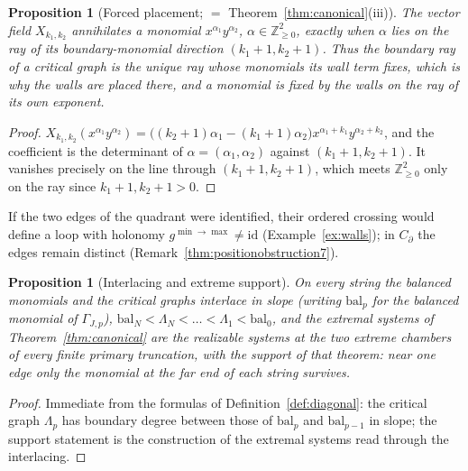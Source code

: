 \documentclass[11pt]{amsart}
\newtheorem{proposition}[theorem]{Proposition}
\theoremstyle{definition}
\theoremstyle{remark}
\newcommand{\ZZ}{\mathbb{Z}}
\begin{document}
\begin{proposition}[Forced placement; $=$ Theorem~\ref{thm:canonical}(iii)]
\label{prop:placement}
The vector field $X_{k_{1},k_{2}}$ annihilates a monomial
$x^{\alpha_1}y^{\alpha_2}$, $\alpha\in\ZZ^2_{\ge0}$, exactly when $\alpha$ lies
on the ray of its boundary-monomial direction $(k_{1}{+}1,k_{2}{+}1)$.  Thus the boundary
ray of a critical graph is the unique ray whose monomials its wall term
fixes, which is why the walls are placed there, and a monomial is fixed by the
walls on the ray of its own exponent.
\end{proposition}

\begin{proof}
$X_{k_{1},k_{2}}(x^{\alpha_1}y^{\alpha_2})=\bigl((k_{2}{+}1)\alpha_1
-(k_{1}{+}1)\alpha_2\bigr)x^{\alpha_1+k_{1}}y^{\alpha_2+k_{2}}$, and the
coefficient is the determinant of $\alpha=(\alpha_1,\alpha_2)$ against
$(k_{1}{+}1,k_{2}{+}1)$.  It vanishes precisely on the line through
$(k_{1}{+}1,k_{2}{+}1)$, which meets $\ZZ^2_{\ge0}$ only on the ray since
$k_1+1,k_2+1>0$.
\end{proof}

If the two edges of the quadrant were identified, their ordered crossing would
define a loop with holonomy $g^{\min\to\max}\ne\mathrm{id}$
(Example~\ref{ex:walls}); in $C_\partial$ the edges remain distinct
(Remark~\ref{thm:positionobstruction7}).

\begin{proposition}[Interlacing and extreme support]
\label{prop:interlace}
On every string the balanced monomials and the critical graphs interlace in
slope (writing $\mathrm{bal}_{p}$ for the balanced monomial of $\Gamma_{J,p}$),
$\mathrm{bal}_{N}<\Lambda_{N}<\dots<\Lambda_{1}<\mathrm{bal}_{0}$, and the
extremal systems of Theorem~\ref{thm:canonical} are the realizable systems at
the two extreme chambers of every finite primary truncation, with the support
of that theorem: near one edge only the monomial at the far end of each
string survives.
\end{proposition}

\begin{proof}
Immediate from the formulas of Definition~\ref{def:diagonal}: the critical
graph $\Lambda_{p}$ has boundary degree between those of $\mathrm{bal}_{p}$ and
$\mathrm{bal}_{p-1}$ in slope; the support statement is the construction of
the extremal systems read through the interlacing.
\end{proof}
\end{document}
